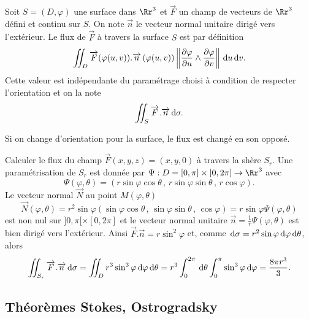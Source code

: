 \documentclass[class=report,crop=false]{standalone}
\begin{document}
\vskip6mm

\begin{definition}[\bf Proposition]Soit $S=(D,\varphi)$ une surface dans $\Rr^3$ et $\overrightarrow{F}$ un champ de vecteurs de $\Rr^3$ défini et continu sur $S$. On note $\overrightarrow{n}$ le vecteur normal unitaire dirigé vers l'extérieur. Le flux de $\overrightarrow{F}$ à travers la surface $S$ est par définition
$$\int \!\!\!\!\int _D\overrightarrow{F}(\varphi(u,v)).\overrightarrow{n}\left(\varphi (u,v)\right)\left\|\frac{\partial \varphi }{\partial u}\wedge \frac{\partial \varphi }{\partial v}\right\|\,\mathrm{d} u\,\mathrm{d} v.$$
Cette valeur est indépendante du paramétrage choisi à condition de respecter l'orientation et on la note
$$\int \!\!\!\!\int _S\overrightarrow{F}.\overrightarrow{n}\,\mathrm{d} \sigma .$$
\end{definition}

\vskip4mm

Si on change d'orientation pour la surface, le flux est changé en son opposé.

\vskip6mm

Calculer le flux du champ $\overrightarrow{F}(x,y,z)=(x,y,0)$ à travers la shère $S_r$. Une paramétrisation de $S_r$ est donnée par $\displaystyle \Psi :D=[0,\pi ]\times [0,2\pi]\to \Rr^3$ avec
$$\Psi (\varphi ,\theta )=\left(r\sin \varphi \cos \theta \, ,\, r\sin \varphi \sin \theta  \, ,\, r\cos \varphi \right).$$
Le vecteur normal $\overrightarrow{N}$ au point $M(\varphi ,\theta)$
$$\overrightarrow{N}(\varphi ,\theta )=r^2\sin \varphi \left(\sin \varphi \cos \theta \, ,\, \sin \varphi \sin \theta \, ,\, \cos \varphi \right)=r\sin \varphi \Psi (\varphi ,\theta )$$
est non nul sur $]0,\pi [\times [0,2\pi]$ et le vecteur normal unitaire $\displaystyle \overrightarrow{n}=\frac{1}{r}\Psi (\varphi ,\theta )$ est bien dirigé vers l'extérieur. Ainsi $\overrightarrow{F}.\overrightarrow{n}=r\sin ^2\varphi$ et, comme $\,\mathrm{d} \sigma =r^2\sin \varphi \,\mathrm{d} \varphi \,\mathrm{d} \theta$, alors
$$\int \!\!\!\!\int _{S_r}\overrightarrow{F}.\overrightarrow{n}\d \sigma =\int \!\!\!\!\int _Dr^3\sin ^3\varphi \d \varphi \d \theta=r^3\int _0^{2\pi}\d \theta \int _0^{\pi}\sin ^3\varphi \d \varphi =\frac{8\pi r^3}{3}.$$

\vskip8mm

\subsection{Théorèmes Stokes, Ostrogradsky}
\end{document}
